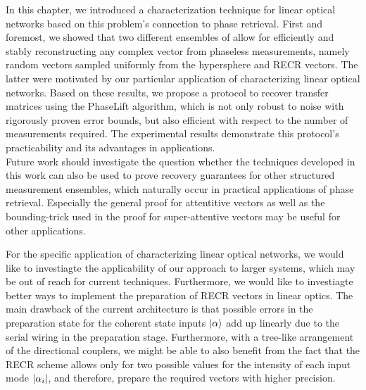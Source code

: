 In this chapter, we introduced a characterization technique for linear optical networks based on this problem's connection to phase retrieval.
First and foremost, we showed that two different ensembles of  allow for efficiently and stably reconstructing any complex vector from phaseless measurements, namely random vectors sampled uniformly from the hypersphere and RECR vectors.
The latter were motivated by our particular application of characterizing linear optical networks.
Based on these results, we propose a protocol to recover transfer matrices using the PhaseLift algorithm, which is not only robust to noise with rigorously proven error bounds, but also efficient with respect to the number of measurements required.
The experimental results demonstrate this protocol's practicability and its advantages in applications.\\


Future work should investigate the question whether the techniques developed in this work can also be used to prove recovery guarantees for other structured measurement ensembles, which naturally occur in practical applications of phase retrieval.
Especially the general proof for attentitive vectors as well as the bounding-trick used in the proof for super-attentive vectors may be useful for other applications.

For the specific application of characterizing linear optical networks, we would like to investiagte the applicability of our approach to larger systems, which may be out of reach for current techniques.
Furthermore, we would like to investiagte better ways to implement the preparation of RECR vectors in linear optics.
The main drawback of the current architecture is that possible errors in the preparation state for the coherent state inputs $\ket{\alpha}$ add up linearly due to the serial wiring in the preparation stage.
Furthermore, with a tree-like arrangement of the directional couplers, we might be able to also benefit from the fact that the RECR scheme allows only for two possible values for the intensity of each input mode ${\vert\alpha_i\vert}$, and therefore, prepare the required vectors with higher precision.
